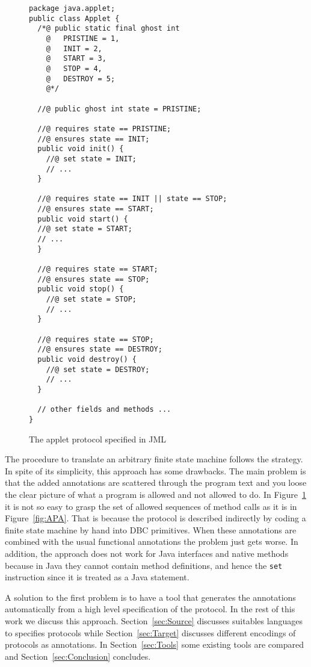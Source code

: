 \documentclass[a4paper,10pt]{article}
\begin{document}
\begin{figure}
\begin{verbatim}
package java.applet;
public class Applet {
  /*@ public static final ghost int
    @   PRISTINE = 1,
    @   INIT = 2,
    @   START = 3,
    @   STOP = 4,
    @   DESTROY = 5; 
    @*/

  //@ public ghost int state = PRISTINE;

  //@ requires state == PRISTINE;
  //@ ensures state == INIT;
  public void init() {
    //@ set state = INIT;
    // ... 
  }
  
  //@ requires state == INIT || state == STOP;
  //@ ensures state == START;
  public void start() {
  //@ set state = START; 
  // ... 
  }
  
  //@ requires state == START;
  //@ ensures state == STOP;
  public void stop() {
    //@ set state = STOP;
    // ... 
  }
  
  //@ requires state == STOP;
  //@ ensures state == DESTROY;
  public void destroy() {
    //@ set state = DESTROY;
    // ...
  }
  
  // other fields and methods ...
}
\end{verbatim} 
\caption{The applet protocol specified in JML}\label{fig:APJML}
\end{figure}

The procedure to translate an arbitrary finite state machine follows the
strategy. In spite of its simplicity, this approach has some drawbacks.
The main problem is that the added annotations are scattered through the program
text and you loose the clear picture of what a program is allowed and
not allowed to do. In Figure~\ref{fig:APJML} it is not so easy to grasp the
set of allowed sequences of method calls as it is in Figure~\ref{fig:APA}. That
is because the protocol is described indirectly by coding a finite state machine
by hand into DBC primitives. When these annotations are combined with the usual
functional annotations the problem just gets worse. 
In addition, the approach does not work for Java interfaces and native methods
because in Java they cannot contain method definitions, and hence the
\texttt{set} instruction since it is treated as a Java statement.

A solution to the first problem is to have a tool that generates the
annotations automatically from a high level specification of the protocol. In
the rest of this work we discuss this approach.
Section~\ref{sec:Source} discusses suitables languages to specifies protocols
while Section~\ref{sec:Target} discusses different encodings of protocols as
annotations. In Section~\ref{sec:Tools} some existing tools are compared and
Section~\ref{sec:Conclusion} concludes.
\end{document}
